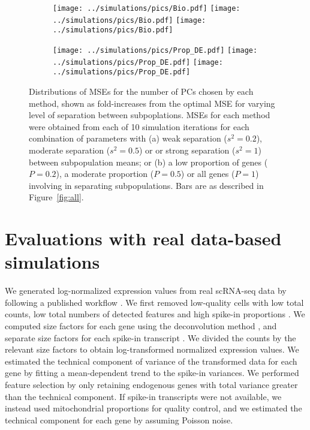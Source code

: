 \documentclass[10pt,letterpaper]{article}
\begin{document}
\begin{figure}
\begin{subfigure}[b]{\textwidth}
    \texttt{[image: ../simulations/pics/Bio.pdf]}
    \texttt{[image: ../simulations/pics/Bio.pdf]}
    \texttt{[image: ../simulations/pics/Bio.pdf]}
\caption{}
\end{subfigure}
\begin{subfigure}[b]{\textwidth}
    \texttt{[image: ../simulations/pics/Prop\_DE.pdf]}
    \texttt{[image: ../simulations/pics/Prop\_DE.pdf]}
    \texttt{[image: ../simulations/pics/Prop\_DE.pdf]}
\caption{}
\end{subfigure}
\caption{Distributions of MSEs for the number of PCs chosen by each method, shown as fold-increases from the optimal MSE for varying level of separation between subpoplations.
MSEs for each method were obtained from each of 10 simulation iterations for each combination of parameters with 
(a) weak separation ($s^2=0.2$), moderate separation ($s^2 = 0.5$) or or strong separation ($s^2 = 1$) between subpopulation means;
or (b) a low proportion of genes ($P = 0.2$), a moderate proportion ($P=0.5$) or all genes ($P=1$) involving in separating subpopulations.
Bars are as described in Figure~\ref{fig:all}.    
}
\label{fig:bio}
\end{figure}

\section{Evaluations with real data-based simulations}

We generated log-normalized expression values from real scRNA-seq data by following a published workflow \cite{lun2016stepbystep}.
We first removed low-quality cells with low total counts, low total numbers of detected features and high spike-in proportions \cite{mccarthy2017scater}.
We computed size factors for each gene using the deconvolution method \cite{lun2016pooling}, and separate size factors for each spike-in transcript \cite{lun2017assessing}.
We divided the counts by the relevant size factors to obtain log-transformed normalized expression values.
We estimated the technical component of variance of the transformed data for each gene by fitting a mean-dependent trend to the spike-in variances.
We performed feature selection by only retaining endogenous genes with total variance greater than the technical component.
If spike-in transcripts were not available, we instead used mitochondrial proportions for quality control,
and we estimated the technical component for each gene by assuming Poisson noise.  
\end{document}
